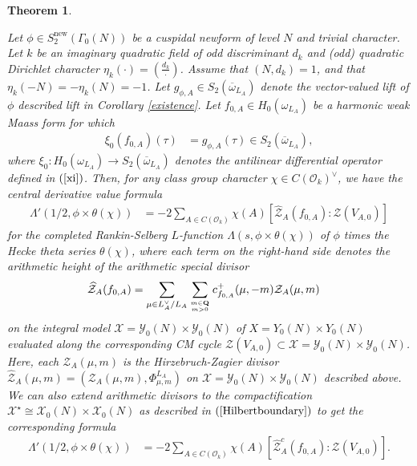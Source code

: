 \documentclass{amsart}
\newtheorem{theorem}{Theorem}[section]
\theoremstyle{definition}
\theoremstyle{definition}
\theoremstyle{definition}
\begin{document}
\begin{theorem}\label{main}

Let $\phi \in S_2^{\operatorname{new}}(\Gamma_0(N))$ be a cuspidal newform of level $N$ and trivial character. 
Let $k$ be an imaginary quadratic field of odd discriminant $d_k$ and (odd) quadratic Dirichlet character $\eta_k(\cdot) = (\frac{d_k}{\cdot})$.
Assume that $(N, d_k)=1$, and that $\eta_k(-N) = - \eta_k(N) = -1$. 
Let $g_{\phi, A} \in S_2(\overline{\omega}_{L_A})$ denote the vector-valued lift of $\phi$ described lift in Corollary \ref{existence}. 
Let $f_{0, A} \in H_0(\omega_{L_A})$ be a harmonic weak Maass form for which 
\begin{align*} \xi_0(f_{0,A})(\tau) &= g_{\phi, A}(\tau) \in S_2(\overline{\omega}_{L_A}), \end{align*}
where $\xi_0: H_0(\omega_{L_A}) \rightarrow S_2(\overline{\omega}_{L_A})$ denotes the antilinear differential operator defined in $(\ref{xi})$.
Then, for any class group character $\chi \in C(\mathcal{O}_k)^{\vee}$, we have the central derivative value formula 
\begin{align*} \Lambda'(1/2, \phi \times \theta(\chi)) &= - 2 \sum\limits_{A \in C(\mathcal{O}_k)} \chi(A) 
\left[ \widehat{\mathcal{Z}}_A(f_{0, A}): \mathcal{Z}(V_{A,0})\right] \end{align*}
for the completed Rankin-Selberg $L$-function $\Lambda(s, \phi \times \theta(\chi))$ of $\phi$ times
the Hecke theta series $\theta(\chi)$, where each term on the right-hand side denotes the arithmetic height of the arithmetic special divisor 
\begin{align*} \widehat{\mathcal{Z}}_A(f_{0, A}) 
&= \sum\limits_{\mu \in L_A^{\vee}/L_A} \sum\limits_{m \in {\bf{Q}} \atop m > 0} c_{f_{0, A}}^+(\mu, -m) \mathcal{Z}_A(\mu, m) \end{align*} on the 
integral model $\mathcal{X} = \mathcal{Y}_0(N) \times \mathcal{Y}_0(N)$ of 
$X = Y_0(N) \times Y_0(N)$ evaluated along the corresponding CM cycle 
$\mathcal{Z}(V_{A,0}) \subset \mathcal{X} = \mathcal{Y}_0(N) \times \mathcal{Y}_0(N)$. Here, each $\mathcal{Z}_A(\mu, m)$
is the Hirzebruch-Zagier divisor 
$\widehat{\mathcal{Z}}_A(\mu, m) = (\mathcal{Z}_A(\mu, m), \Phi^{L_A}_{\mu, m})$
on $\mathcal{X} = \mathcal{Y}_0(N) \times \mathcal{Y}_0(N)$ described above.
We can also extend arithmetic divisors to the compactification 
$\mathcal{X}^{\star} \cong \mathcal{X}_0(N) \times \mathcal{X}_0(N)$ 
as described in $(\ref{Hilbertboundary})$ to get the corresponding formula 
\begin{align*} \Lambda'(1/2, \phi \times \theta(\chi)) &= - 2 \sum\limits_{A \in C(\mathcal{O}_k)} \chi(A) 
\left[ \widehat{\mathcal{Z}}_A^c(f_{0, A}): \mathcal{Z}(V_{A,0})\right]. \end{align*}

\end{theorem}
\end{document}
